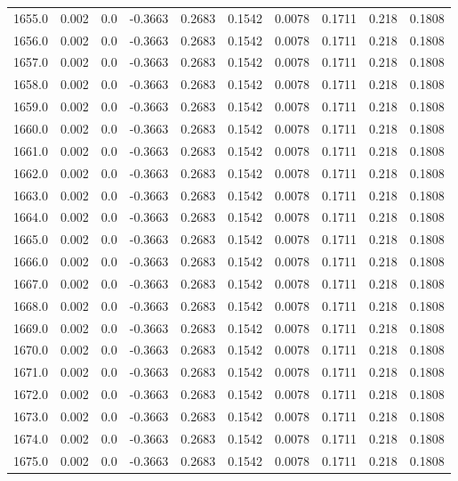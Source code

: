 \begin{longtable}{lrrrrrrrrr}
1655.0 & 0.002 & 0.0 & -0.3663 & 0.2683 & 0.1542 & 0.0078 & 0.1711 & 0.218 & 0.1808 \\
1656.0 & 0.002 & 0.0 & -0.3663 & 0.2683 & 0.1542 & 0.0078 & 0.1711 & 0.218 & 0.1808 \\
1657.0 & 0.002 & 0.0 & -0.3663 & 0.2683 & 0.1542 & 0.0078 & 0.1711 & 0.218 & 0.1808 \\
1658.0 & 0.002 & 0.0 & -0.3663 & 0.2683 & 0.1542 & 0.0078 & 0.1711 & 0.218 & 0.1808 \\
1659.0 & 0.002 & 0.0 & -0.3663 & 0.2683 & 0.1542 & 0.0078 & 0.1711 & 0.218 & 0.1808 \\
1660.0 & 0.002 & 0.0 & -0.3663 & 0.2683 & 0.1542 & 0.0078 & 0.1711 & 0.218 & 0.1808 \\
1661.0 & 0.002 & 0.0 & -0.3663 & 0.2683 & 0.1542 & 0.0078 & 0.1711 & 0.218 & 0.1808 \\
1662.0 & 0.002 & 0.0 & -0.3663 & 0.2683 & 0.1542 & 0.0078 & 0.1711 & 0.218 & 0.1808 \\
1663.0 & 0.002 & 0.0 & -0.3663 & 0.2683 & 0.1542 & 0.0078 & 0.1711 & 0.218 & 0.1808 \\
1664.0 & 0.002 & 0.0 & -0.3663 & 0.2683 & 0.1542 & 0.0078 & 0.1711 & 0.218 & 0.1808 \\
1665.0 & 0.002 & 0.0 & -0.3663 & 0.2683 & 0.1542 & 0.0078 & 0.1711 & 0.218 & 0.1808 \\
1666.0 & 0.002 & 0.0 & -0.3663 & 0.2683 & 0.1542 & 0.0078 & 0.1711 & 0.218 & 0.1808 \\
1667.0 & 0.002 & 0.0 & -0.3663 & 0.2683 & 0.1542 & 0.0078 & 0.1711 & 0.218 & 0.1808 \\
1668.0 & 0.002 & 0.0 & -0.3663 & 0.2683 & 0.1542 & 0.0078 & 0.1711 & 0.218 & 0.1808 \\
1669.0 & 0.002 & 0.0 & -0.3663 & 0.2683 & 0.1542 & 0.0078 & 0.1711 & 0.218 & 0.1808 \\
1670.0 & 0.002 & 0.0 & -0.3663 & 0.2683 & 0.1542 & 0.0078 & 0.1711 & 0.218 & 0.1808 \\
1671.0 & 0.002 & 0.0 & -0.3663 & 0.2683 & 0.1542 & 0.0078 & 0.1711 & 0.218 & 0.1808 \\
1672.0 & 0.002 & 0.0 & -0.3663 & 0.2683 & 0.1542 & 0.0078 & 0.1711 & 0.218 & 0.1808 \\
1673.0 & 0.002 & 0.0 & -0.3663 & 0.2683 & 0.1542 & 0.0078 & 0.1711 & 0.218 & 0.1808 \\
1674.0 & 0.002 & 0.0 & -0.3663 & 0.2683 & 0.1542 & 0.0078 & 0.1711 & 0.218 & 0.1808 \\
1675.0 & 0.002 & 0.0 & -0.3663 & 0.2683 & 0.1542 & 0.0078 & 0.1711 & 0.218 & 0.1808 \\

\end{longtable}
